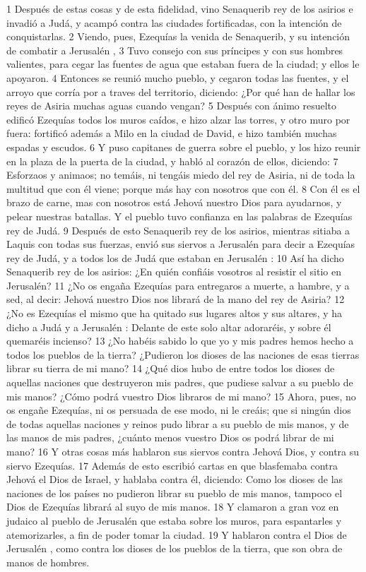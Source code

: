 1 Después de estas cosas y de esta fidelidad, vino Senaquerib rey de los asirios e invadió a Judá, y acampó contra las ciudades fortificadas, con la intención de conquistarlas.
2 Viendo, pues, Ezequías la venida de Senaquerib, y su intención de combatir a Jerusalén ,
3 Tuvo consejo con sus príncipes y con sus hombres valientes, para cegar las fuentes de agua que estaban fuera de la ciudad; y ellos le apoyaron.
4 Entonces se reunió mucho pueblo, y cegaron todas las fuentes, y el arroyo que corría por a traves del territorio, diciendo: ¿Por qué han de hallar los reyes de Asiria muchas aguas cuando vengan?
5 Después con ánimo resuelto edificó Ezequías todos los muros caídos, e hizo alzar las torres, y otro muro por fuera: fortificó además a Milo en la ciudad de David, e hizo también muchas espadas y escudos.
6 Y puso capitanes de guerra sobre el pueblo, y los hizo reunir en la plaza de la puerta de la ciudad, y habló al corazón de ellos, diciendo:
7 Esforzaos y animaos; no temáis, ni tengáis miedo del rey de Asiria, ni de toda la multitud que con él viene; porque más hay con nosotros que con él.
8 Con él es el brazo de carne, mas con nosotros está Jehová nuestro Dios para ayudarnos, y pelear nuestras batallas. Y el pueblo tuvo confianza en las palabras de Ezequías rey de Judá.
9 Después de esto Senaquerib rey de los asirios, mientras sitiaba a Laquis con todas sus fuerzas, envió sus siervos a Jerusalén para decir a Ezequías rey de Judá, y a todos los de Judá que estaban en Jerusalén :
10 Así ha dicho Senaquerib rey de los asirios: ¿En quién confiáis vosotros al resistir el sitio en Jerusalén?
11 ¿No os engaña Ezequías para entregaros a muerte, a hambre, y a sed, al decir: Jehová nuestro Dios nos librará de la mano del rey de Asiria?
12 ¿No es Ezequías el mismo que ha quitado sus lugares altos y sus altares, y ha dicho a Judá y a Jerusalén : Delante de este solo altar adoraréis, y sobre él quemaréis incienso?
13 ¿No habéis sabido lo que yo y mis padres hemos hecho a todos los pueblos de la tierra? ¿Pudieron los dioses de las naciones de esas tierras librar su tierra de mi mano?
14 ¿Qué dios hubo de entre todos los dioses de aquellas naciones que destruyeron mis padres, que pudiese salvar a su pueblo de mis manos? ¿Cómo podrá vuestro Dios libraros de mi mano?
15 Ahora, pues, no os engañe Ezequías, ni os persuada de ese modo, ni le creáis; que si ningún dios de todas aquellas naciones y reinos pudo librar a su pueblo de mis manos, y de las manos de mis padres, ¿cuánto menos vuestro Dios os podrá librar de mi mano?
16 Y otras cosas más hablaron sus siervos contra Jehová Dios, y contra su siervo Ezequías.
17 Además de esto escribió cartas en que blasfemaba contra Jehová el Dios de Israel, y hablaba contra él, diciendo: Como los dioses de las naciones de los países no pudieron librar su pueblo de mis manos, tampoco el Dios de Ezequías librará al suyo de mis manos.
18 Y clamaron a gran voz en judaico al pueblo de Jerusalén  que estaba sobre los muros, para espantarles y atemorizarles, a fin de poder tomar la ciudad.
19 Y hablaron contra el Dios de Jerusalén , como contra los dioses de los pueblos de la tierra, que son obra de manos de hombres.

